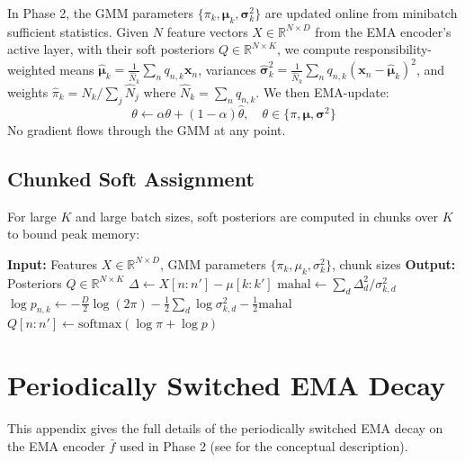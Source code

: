 \documentclass[9pt,twocolumn]{article}
\theoremstyle{plain}
\theoremstyle{definition}
\theoremstyle{remark}
\begin{document}
In Phase 2, the GMM parameters $\{\pi_k, \boldsymbol{\mu}_k, \boldsymbol{\sigma}_k^2\}$ are updated online from minibatch sufficient statistics. Given $N$ feature vectors $X \in \mathbb{R}^{N \times D}$ from the EMA encoder's active layer, with their soft posteriors $Q \in \mathbb{R}^{N \times K}$, we compute responsibility-weighted means $\hat{\boldsymbol{\mu}}_k = \frac{1}{\hat{N}_k}\sum_n q_{n,k} \mathbf{x}_n$, variances $\hat{\boldsymbol{\sigma}}_k^2 = \frac{1}{\hat{N}_k}\sum_n q_{n,k} (\mathbf{x}_n - \hat{\boldsymbol{\mu}}_k)^2$, and weights $\hat{\pi}_k = \hat{N}_k / \sum_j \hat{N}_j$ where $\hat{N}_k = \sum_n q_{n,k}$. We then EMA-update:
\begin{equation}
\theta \leftarrow \alpha \theta + (1-\alpha) \hat{\theta}, \quad \theta \in \{\pi, \boldsymbol{\mu}, \boldsymbol{\sigma}^2\}
\end{equation}
No gradient flows through the GMM at any point.

\subsection{Chunked Soft Assignment}

For large $K$ and large batch sizes, soft posteriors are computed in chunks over $K$ to bound peak memory:

\begin{algorithm}[h]
\caption{Chunked Soft Assignment}
\begin{algorithmic}[1]
\STATE \textbf{Input:} Features $X \in \mathbb{R}^{N \times D}$, GMM parameters $\{\pi_k, \mu_k, \sigma_k^2\}$, chunk sizes
\STATE \textbf{Output:} Posteriors $Q \in \mathbb{R}^{N \times K}$
        \STATE $\Delta \gets X[n:n'] - \mu[k:k']$
        \STATE $\text{mahal} \gets \sum_d \Delta_d^2 / \sigma_{k,d}^2$
        \STATE $\log p_{n,k} \gets -\frac{D}{2}\log(2\pi) - \frac{1}{2}\sum_d \log \sigma_{k,d}^2 - \frac{1}{2}\text{mahal}$
    \ENDFOR
    \STATE $Q[n:n'] \gets \text{softmax}(\log \pi + \log p)$
\ENDFOR
\end{algorithmic}
\end{algorithm}

\section{Periodically Switched EMA Decay}
\label{app:cyclic-ema}


This appendix gives the full details of the periodically switched EMA decay on the EMA encoder $\bar{f}$ used in Phase 2 (see  for the conceptual description).
\end{document}
